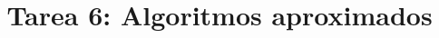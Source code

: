 \documentclass{doc}
\title{Tarea 6: Algoritmos aproximados}
\begin{document}
\makedocheader

\end{document}
